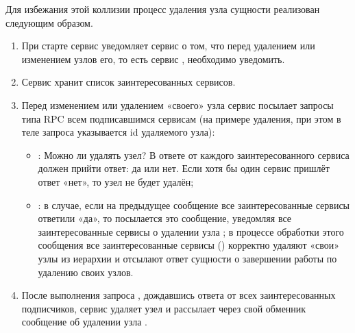 \documentclass[a4paper,10pt,russian]{sphinxmanual}
\begin{document}
\sphinxAtStartPar
Для избежания этой коллизии процесс удаления узла сущности реализован
следующим образом.
\begin{enumerate}
%
\item {}
\sphinxAtStartPar
При старте сервис  уведомляет сервис  о том,
что перед удалением или изменением узлов  его, то есть
сервис , необходимо уведомить.

\item {}
\sphinxAtStartPar
Сервис  хранит список заинтересованных сервисов.

\item {}
\sphinxAtStartPar
Перед изменением или удалением «своего» узла сервис
 посылает запросы типа RPC всем подписавшимся
сервисам (на примере удаления, при этом в теле запроса указывается
id удаляемого узла):
\begin{itemize}
\item {}
\sphinxAtStartPar
{}: Можно ли удалять узел? В ответе от каждого
заинтересованного сервиса должен прийти ответ: да или нет.
Если хотя бы один сервис пришлёт ответ «нет», то узел не будет удалён;

\item {}
\sphinxAtStartPar
{}: в случае, если на предыдущее сообщение все заинтересованные
сервисы ответили «да», то посылается это сообщение, уведомляя все
заинтересованные сервисы о удалении узла ; в процессе обработки
этого сообщения все заинтересованные сервисы () корректно
удаляют «свои» узлы из иерархии и отсылают ответ сущности 
о завершении работы по удалению своих узлов.

\end{itemize}

\item {}
\sphinxAtStartPar
После выполнения запроса , дождавшись ответа от всех
заинтересованных подписчиков, сервис  удаляет
узел  и рассылает через свой обменник
 сообщение об удалении узла .

\end{enumerate}
\end{document}
